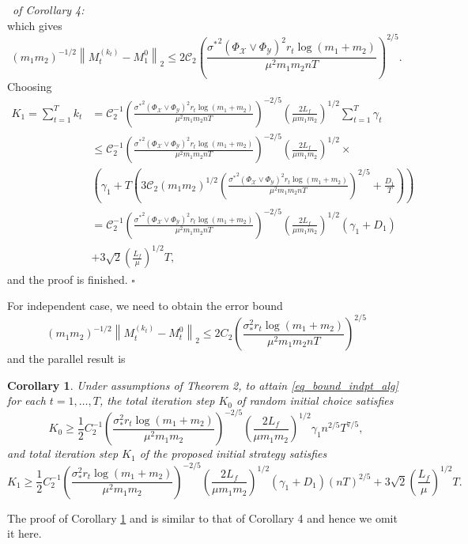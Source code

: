 \documentclass[12pt]{article}
\newtheorem{cor}{Corollary}
\newenvironment{pf}{{\noindent\it Proof}\ }{\hfill $\square$\par}
\begin{document}
\begin{pf}{\it of Corollary 4:}
\begin{equation*}
  \end{equation*}
  which gives
  \begin{equation*}
  (m_1m_2)^{-1/2}\left\|M_t^{(k_t)} - M_1^0\right\|_2\le2\mathcal{C}_2\left(\frac{{\sigma^*}^2(\Phi_\mathcal{X}\vee \Phi_\mathcal{Y})^2r_t\log(m_1+m_2)}{\mu^2m_1m_2 n T}\right)^{2/5}.
  \end{equation*}
  Choosing
  \begin{align*}
  K_1=\sum_{t=1}^T k_t &= \mathcal{C}_2^{-1}\left(\frac{{\sigma^*}^2(\Phi_\mathcal{X}\vee \Phi_\mathcal{Y})^2r_t\log(m_1+m_2)}{\mu^2m_1m_2 n T}\right)^{-2/5} \left(\frac{2L_f}{\mu m_1m_2}\right)^{1/2}\sum_{t=1}^T {\gamma_t}\\&\le 
  \mathcal{C}_2^{-1}\left(\frac{{\sigma^*}^2(\Phi_\mathcal{X}\vee \Phi_\mathcal{Y})^2r_t\log(m_1+m_2)}{\mu^2m_1m_2 n T}\right)^{-2/5} \left(\frac{2L_f}{\mu m_1m_2}\right)^{1/2} \times\\&
  \left(\gamma_1 + T\left(3\mathcal{C}_2(m_1m_2)^{1/2}\left(\frac{{\sigma^*}^2(\Phi_\mathcal{X}\vee \Phi_\mathcal{Y})^2r_t\log(m_1+m_2)}{\mu^2m_1m_2 n T}\right)^{2/5}+ \frac{D_1}{T}\right)\right)\\&=
  \mathcal{C}_2^{-1}\left(\frac{{\sigma^*}^2(\Phi_\mathcal{X}\vee \Phi_\mathcal{Y})^2r_t\log(m_1+m_2)}{\mu^2m_1m_2 n T}\right)^{-2/5} \left(\frac{2L_f}{\mu m_1m_2}\right)^{1/2}(\gamma_1 +D_1) \\&+ 3\sqrt{2}(\frac{L_f}{\mu})^{1/2}T,
  \end{align*}
  and the proof is finished.
\end{pf}
For independent case, we need to obtain the error bound
 \begin{equation}\label{eq_bound_indpt_alg}
  (m_1m_2)^{-1/2}\left\|M_t^{(k_t)} - M_t^0\right\|_2 \le 2C_2\left(\frac{\sigma_*^2r_t\log(m_1+m_2)}{\mu^2m_1m_2 n T}\right)^{2/5}
  \end{equation}
  and the parallel result is 
  \begin{cor}
  \label{cor_iteration_step_indpt}
  Under assumptions of Theorem 2, to attain \eqref{eq_bound_indpt_alg} for each $t=1,\ldots,T$,
  the total iteration step $K_0$ of random initial choice satisfies
  \begin{equation*}
  K_0 \ge  \frac{1}{2}C_2^{-1}\left(\frac{\sigma_*^2r_t\log(m_1+m_2)}{\mu^2m_1m_2}\right)^{-2/5} \left(\frac{2L_f}{\mu m_1m_2}\right)^{1/2}\gamma_1 n^{2/5}T^{7/5},
  \end{equation*}
  and total iteration step $K_1$ of the proposed initial strategy satisfies
  \begin{equation*}
  K_1 \ge  \frac{1}{2} C_2^{-1}\left(\frac{\sigma_*^2 r_t\log(m_1+m_2)}{\mu^2m_1m_2}\right)^{-2/5}\left(\frac{2L_f}{\mu m_1m_2}\right)^{1/2} (\gamma_1 +D_1) (nT)^{2/5}+ 3\sqrt{2}\left(\frac{L_f}{\mu}\right)^{1/2}T.
  \end{equation*}
  \end{cor}
  The proof of Corollary \ref{cor_iteration_step_indpt} and is similar to that of Corollary 4 and hence we omit it here.%
\end{document}
